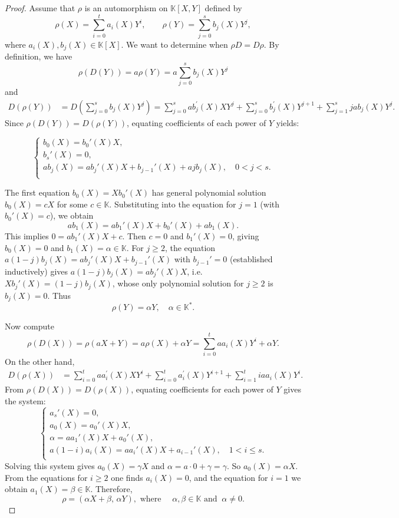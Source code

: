 \documentclass[10pt,a4paper]{amsart}
\begin{document}
\begin{proof}
Assume that $\rho$ is an automorphism on $\mathbb{K}[X,Y]$ defined by
\[
\rho(X) = \sum_{i=0}^t a_i(X) Y^i, \qquad \rho(Y) = \sum_{j=0}^s b_j(X) Y^j,
\]
where  $a_i(X), b_j(X) \in \mathbb{K}[X]$. We want to determine when $\rho D = D \rho$. By definition, we have
\[
\rho(D(Y)) = a \rho(Y) = a \sum_{j=0}^s b_j(X) Y^j
\]
and
\begin{align*}
D(\rho(Y)) 
&= D\left( \sum_{j=0}^s b_j(X) Y^j \right)
=\sum_{j=0}^sab_j^{'}(X)XY^j+\sum_{j=0}^sb_j^{'}(X)Y^{j+1} + \sum_{j=1}^sjab_j(X) Y^j.
\end{align*}
Since $\rho(D(Y)) = D(\rho(Y))$, equating coefficients of each power of $Y$ yields:

\begin{equation*}
    \begin{cases} 
    b_0(X) = b_0'(X) X,\\
    b_s'(X) = 0, \\ 
   a b_j(X) =  a b_j'(X) X + b_{j-1}'(X) + ajb_j(X), \quad 0<j<s.\\
    \end{cases}
    \end{equation*}

The first equation $b_0(X)=Xb_0'(X)$ has general polynomial solution $b_0(X)=cX$ for some $c\in\mathbb{K}$. Substituting into the equation for $j=1$ (with $b_0'(X)=c$), we obtain  
\[
ab_1(X) = ab_1'(X)X + b_0'(X) + ab_1(X). 
\]
This implies  $0 = ab_1'(X)X + c$. Then $c=0$ and $b_1'(X)=0$, giving $b_0(X)=0$ and $b_1(X)=\alpha\in\mathbb{K}$. For $j\geq 2$, the equation $a(1-j)b_j(X) = ab_j'(X)X + b_{j-1}'(X)$ with $b_{j-1}'=0$ (established inductively) gives $a(1-j)b_j(X)=ab_j'(X)X$, i.e.\ $Xb_j'(X)=(1-j)b_j(X)$, whose only polynomial solution for $j\geq 2$ is $b_j(X)=0$. Thus
\[
\rho(Y) = \alpha Y, \quad \alpha \in \mathbb{K}^*.
\]

Now compute 
\[
\rho(D(X)) = \rho(aX + Y) = a \rho(X) + \alpha Y=\sum_{i=0}^t aa_i(X) Y^i+\alpha Y.
\]
On the other hand,
\begin{align*}
D(\rho(X)) 
&= \sum_{i=0}^t aa_i^{'}(X)XY^i+\sum_{i=0}^t a_i^{'}(X)Y^{i+1} + \sum_{i=1}^t iaa_i(X)Y^i.
\end{align*}
From $\rho(D(X))=D(\rho(X))$, equating coefficients for each power of $Y$ gives the system:
\begin{equation*} 
    \begin{cases}
    a_s'(X) = 0,\\
    a_0(X) = a_0'(X) X,\\
    \alpha = a a_1'(X) X + a_0'(X), \\ 
   a(1-i) a_i(X) = a a_i'(X) X + a_{i-1}'(X), \quad 1<i\leq s.\\
    \end{cases}
    \end{equation*}
Solving this system gives $a_0(X)=\gamma X$ and  $\alpha = a\cdot 0 + \gamma = \gamma$. So $a_0(X)=\alpha X$. From the equations for $i\geq 2$ one finds $a_i(X)=0$, and the  equation for $i=1$ we obtain $a_1(X)=\beta\in\mathbb{K}$. Therefore, 
\[
\rho=(\alpha X + \beta, \, \alpha Y ), \mbox{ where } \quad \alpha,\beta \in \mathbb{K} \mbox{ and }\ \alpha\neq 0.
\]
\end{proof}
\end{document}

